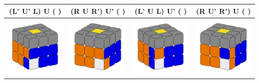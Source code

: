 \documentclass[12pt, a3paper]{article}
\newcommand{\scale}{1}
\begin{document}
\begin{center}
\begin{longtable}{c|c||c|c}
	(L' U' L) U ( ) & (R U R') U' ( ) & (L' U L) U' ( ) & (R U' R') U ( ) \\
	\hline
	\includegraphics[scale=\scale]{17l} & \includegraphics[scale=\scale]{17r}  &  \includegraphics[scale=\scale]{18l} & \includegraphics[scale=\scale]{18r} \\

\end{longtable}
\end{center}
\end{document}
